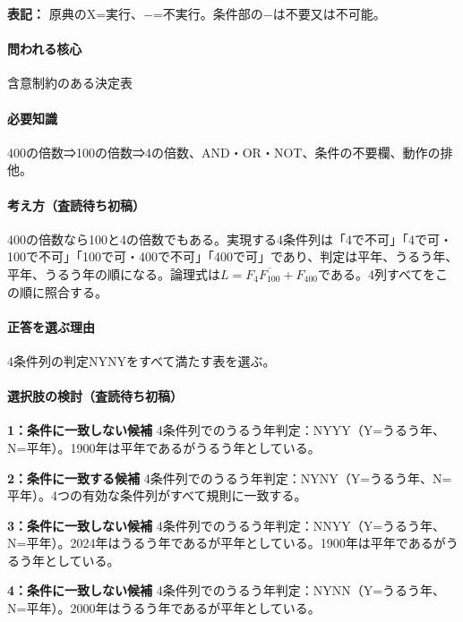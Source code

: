 \noindent\textbf{表記：} 原典のX=実行、−=不実行。条件部の−は不要又は不可能。\par

\paragraph{問われる核心} 含意制約のある決定表

\paragraph{必要知識} 400の倍数⇒100の倍数⇒4の倍数、AND・OR・NOT、条件の不要欄、動作の排他。

\paragraph{考え方（査読待ち初稿）} 400の倍数なら100と4の倍数でもある。実現する4条件列は「4で不可」「4で可・100で不可」「100で可・400で不可」「400で可」であり、判定は平年、うるう年、平年、うるう年の順になる。論理式は\(L=F_4\overline{F_{100}}+F_{400}\)である。4列すべてをこの順に照合する。

\paragraph{正答を選ぶ理由} 4条件列の判定NYNYをすべて満たす表を選ぶ。

\paragraph{選択肢の検討（査読待ち初稿）}\mbox{}\par

\noindent\textbf{1：条件に一致しない候補} 4条件列でのうるう年判定：NYYY（Y=うるう年、N=平年）。1900年は平年であるがうるう年としている。\par

\noindent\textbf{2：条件に一致する候補} 4条件列でのうるう年判定：NYNY（Y=うるう年、N=平年）。4つの有効な条件列がすべて規則に一致する。\par

\noindent\textbf{3：条件に一致しない候補} 4条件列でのうるう年判定：NNYY（Y=うるう年、N=平年）。2024年はうるう年であるが平年としている。1900年は平年であるがうるう年としている。\par

\noindent\textbf{4：条件に一致しない候補} 4条件列でのうるう年判定：NYNN（Y=うるう年、N=平年）。2000年はうるう年であるが平年としている。\par

